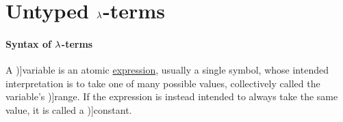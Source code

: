 \section{Untyped \texorpdfstring{\( {\mathrm \lambda} \)}{λ}-terms}\label{sec:untyped_lambda_terms}

\paragraph{Syntax of \( {\mathrm \lambda} \)-terms}

\begin{concept}\label{con:variable}
  A \term[en=variable (\cite[9]{Church1956LogicVol1})]{variable} is an atomic \hyperref[con:expression]{expression}, usually a single symbol, whose intended interpretation is to take one of many possible values, collectively called the variable's \term[en=range (\cite[9]{Church1956LogicVol1})]{range}. If the expression is instead intended to always take the same value, it is called a \term[en=constant (\cite[9]{Church1956LogicVol1})]{constant}.
\end{concept}
